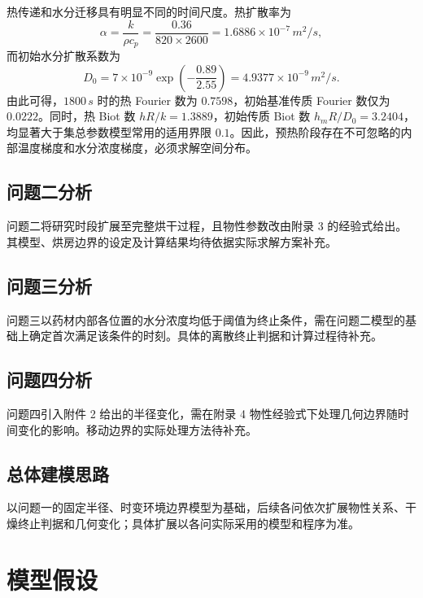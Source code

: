 \documentclass[withoutpreface,bwprint]{cumcmthesis}
\begin{document}
热传递和水分迁移具有明显不同的时间尺度。热扩散率为
\begin{equation}
\alpha=\frac{k}{\rho c_p}
=\frac{0.36}{820\times2600}
=1.6886\times10^{-7}\,\si{m^2/s},
\label{eq:alpha}
\end{equation}
而初始水分扩散系数为
\begin{equation}
D_0=7\times10^{-9}\exp\left(-\frac{0.89}{2.55}\right)
=4.9377\times10^{-9}\,\si{m^2/s}.
\label{eq:d0}
\end{equation}
由此可得，$1800\,\si{s}$ 时的热 Fourier 数为 $0.7598$，初始基准传质 Fourier 数仅为 $0.0222$。同时，热 Biot 数 $hR/k=1.3889$，初始传质 Biot 数 $h_mR/D_0=3.2404$，均显著大于集总参数模型常用的适用界限 $0.1$。因此，预热阶段存在不可忽略的内部温度梯度和水分浓度梯度，必须求解空间分布。

\subsection{问题二分析}

问题二将研究时段扩展至完整烘干过程，且物性参数改由附录 3 的经验式给出。其模型、烘房边界的设定及计算结果均待依据实际求解方案补充。

\subsection{问题三分析}

问题三以药材内部各位置的水分浓度均低于阈值为终止条件，需在问题二模型的基础上确定首次满足该条件的时刻。具体的离散终止判据和计算过程待补充。

\subsection{问题四分析}

问题四引入附件 2 给出的半径变化，需在附录 4 物性经验式下处理几何边界随时间变化的影响。移动边界的实际处理方法待补充。

\subsection{总体建模思路}

以问题一的固定半径、时变环境边界模型为基础，后续各问依次扩展物性关系、干燥终止判据和几何变化；具体扩展以各问实际采用的模型和程序为准。

\section{模型假设}
\end{document}
